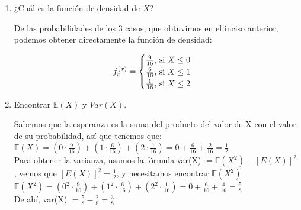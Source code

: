 \documentclass[12pt,a4paper]{report}
\begin{document}
\begin{enumerate}
{\begin{enumerate}
{					Entonces, encontramos la función de distribución sumando las probabilidades de los casos cuando se vayan acumulando:

					\[
				F_{x}^{(x)} = \begin{cases}
								\frac{9}{16}, $ si $ X \leq 0\\
								\frac{15}{16}, $ si $ X \leq 1\\
								1, $ si $ X \leq 2\\
						 	 \end{cases}
			\]


				}

				\item {
					¿Cuál es la función de densidad de $X$?

					De las probabilidades de los 3 casos, que obtuvimos en el inciso anterior, podemos obtener directamente la función de densidad:

					\[
				f_{x}^{(x)} = \begin{cases}
								\frac{9}{16}, $ si $ X \leq 0\\
								\frac{6}{16}, $ si $ X \leq 1\\
								\frac{1}{16}, $ si $ X \leq 2\\
						 	 \end{cases}
			\]

				}

				\item {
					Encontrar $\mathbb{E}(X)$ y $Var(X)$.

					Sabemos que la esperanza es la suma del producto del valor de X con el valor de su probabilidad, así que tenemos que:\\

					$\mathbb{E}(X) = (0 \cdot \frac{9}{16}) + (1 \cdot \frac{6}{16}) + (2 \cdot \frac{1}{16}) = 0 + \frac{6}{16} + \frac{2}{16} = \frac{1}{2}$\\

					Para obtener la varianza, usamos la fórmula var(X) $= \mathbb{E}(X^2) - [E(X)]^2$, vemos que $[E(X)]^2 = \frac{1}{2}$, y necesitamos encontrar $\mathbb{E}(X^2)$\\

					$\mathbb{E}(X^2) =(0^2 \cdot \frac{9}{16}) + (1^2 \cdot \frac{6}{16}) + (2^2 \cdot \frac{1}{16}) = 0 + \frac{6}{16} + \frac{4}{16} = \frac{5}{8} $\\

					De ahí, var(X) $= \frac{5}{8} - \frac{2}{8} = \frac{3}{8}$
				}
			\end{enumerate}
		}


\end{enumerate}
\end{document}

